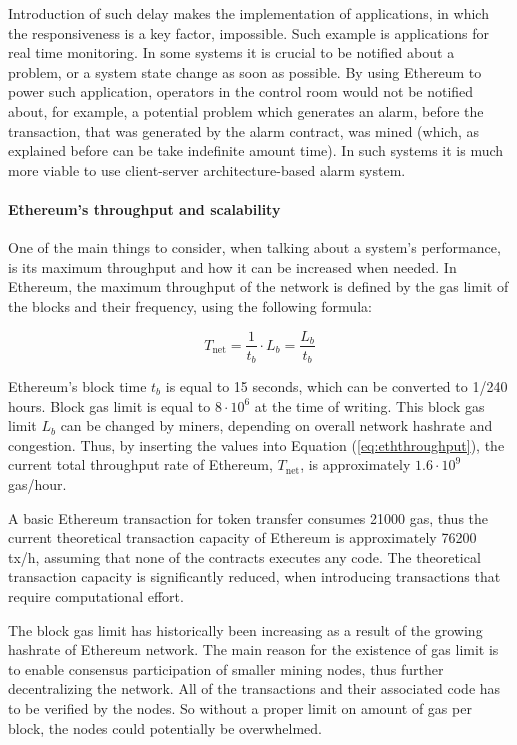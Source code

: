 Introduction of such delay makes the implementation of applications, in which the responsiveness is a key factor, impossible. Such example is applications for real time monitoring. In some systems it is crucial to be notified about a problem, or a system state change as soon as possible. By using Ethereum to power such application, operators in the control room would not be notified about, for example, a potential problem which generates an alarm, before the transaction, that was generated by the alarm contract, was mined (which, as explained before can be take indefinite amount time). In such systems it is much more viable to use client-server architecture-based alarm system.

\paragraph{Ethereum's throughput and scalability} 
One of the main things to consider, when talking about a system's performance, is its maximum throughput and how it can be increased when needed. In Ethereum, the maximum throughput of the network is defined by the gas limit of the blocks and their frequency, using the following formula:

\begin{equation} \label{eq:eththroughput}
T_{\mathrm{net}} = \frac{1}{t_b} \cdot L_b = \frac{L_b}{t_b}
\end{equation}

Ethereum's block time $t_b$ is equal to 15 seconds, which can be converted to 1/240 hours. Block gas limit is equal to $8 \cdot 10^6$ at the time of writing. This block gas limit $L_b$ can be changed by miners, depending on overall network hashrate and congestion. Thus, by inserting the values into Equation (\ref{eq:eththroughput}), the current total throughput rate of Ethereum, $T_{\mathrm{net}}$, is approximately $1.6 \cdot 10^9$ gas/hour.

A basic Ethereum transaction for token transfer consumes 21000 gas, thus the current theoretical transaction capacity of Ethereum is approximately 76200 tx/h, assuming that none of the contracts executes any code. The theoretical transaction capacity is significantly reduced, when introducing transactions that require computational effort. 

The block gas limit has historically been increasing as a result of the growing hashrate of Ethereum network. The main reason for the existence of gas limit is to enable consensus participation of smaller mining nodes, thus further decentralizing the network. All of the transactions and their associated code has to be verified by the nodes. So without a proper limit on amount of gas per block, the nodes could potentially be overwhelmed. 

